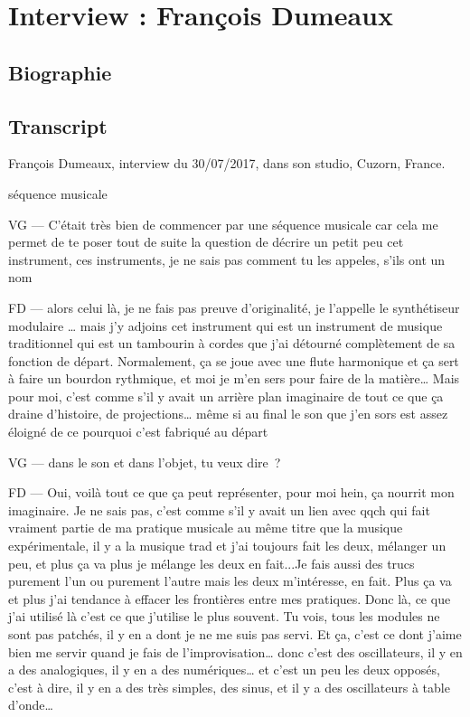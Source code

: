 \chapter{Interview : François Dumeaux}
\label{appendix:dumeaux}

\section*{Biographie}


\section*{Transcript}

François Dumeaux, interview du 30/07/2017, dans son studio, Cuzorn, France.



 séquence musicale 

VG —  C'était très bien de commencer par une séquence musicale car cela me permet de te poser tout de suite la question de décrire un petit peu cet instrument, ces instruments, je ne sais pas comment tu les appeles, s'ils ont un nom 

FD —  alors celui là, je ne fais pas preuve d'originalité, je l'appelle le synthétiseur modulaire … mais j'y adjoins cet instrument qui est un instrument de musique traditionnel qui est un tambourin à cordes que j'ai détourné complètement de sa fonction de départ. Normalement, ça se joue avec une flute harmonique et ça sert à faire un bourdon rythmique, et moi je m'en sers pour faire de la matière… Mais pour moi, c'est comme s'il y avait un arrière plan imaginaire de tout ce que ça draine d'histoire, de projections… même si au final le son que j'en sors est assez éloigné de ce pourquoi c'est fabriqué au départ 

VG —  dans le son et dans l'objet, tu veux dire ? 

FD —  Oui, voilà tout ce que ça peut représenter, pour moi hein, ça nourrit mon imaginaire. Je ne sais pas, c'est comme s'il y avait un lien avec qqch qui fait vraiment partie de ma pratique musicale au même titre que la musique expérimentale, il  y a la musique trad et j'ai toujours fait les deux, mélanger un peu, et plus ça va plus je mélange les deux en fait...Je fais aussi des trucs purement l'un ou purement l'autre mais les deux m'intéresse, en fait. Plus ça va et plus j'ai tendance à effacer les frontières entre mes pratiques. Donc là, ce que j'ai utilisé là c'est ce que j'utilise le plus souvent. Tu vois, tous les modules ne sont pas patchés, il y en a dont je ne me suis pas servi. Et ça, c'est ce dont j'aime bien me servir quand je fais de l'improvisation… donc c'est des oscillateurs, il y en a des analogiques, il y en a des numériques… et c'est un peu les deux opposés, c'est à dire, il y en a des très simples, des sinus, et il y a des oscillateurs à table d'onde… 

